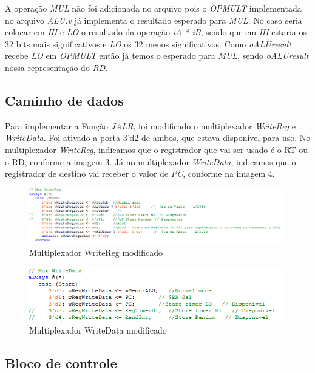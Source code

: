 \documentclass[12pt]{article}
\begin{document}
A operação \textit{MUL} não foi adicionada no arquivo pois o \textit{OPMULT} implementada no arquivo \textit{ALU.v} já implementa o resultado esperado para \textit{MUL}. No caso seria colocar em \textit{HI} e \textit{LO} o resultado da operação \textit{iA * iB}, sendo que em \textit{HI} estaria os 32 bits mais significativos e \textit{LO} os 32 menos significativos. Como \textit{oALUresult} recebe \textit{LO} em \textit{OPMULT} então já temos o esperado para \textit{MUL}, sendo \textit{oALUresult} nossa representação do \textit{RD}.

\subsection{Caminho de dados}
\label{subsec:datapath}

Para implementar a Função \textit{JALR}, foi modificado o multiplexador \textit{WriteReg} e \textit{WriteData}. Foi ativado a porta 3'd2 de ambos, que estava disponível para uso. No multiplexador \textit{WriteReg}, indicamos que o registrador que vai ser usado é o RT ou o RD, conforme a imagem 3. Já no multiplexador \textit{WriteData}, indicamos que o registrador de destino vai receber o valor de \textit{PC}, conforme na imagem 4.    

\begin{figure}[H]
	\flushleft
	\includegraphics[width=1\textwidth]{MUXWR.png}
	\caption{Multiplexador WriteReg modificado}
	\label{fig:pest}
\end{figure}

\begin{figure}[H]
	\flushleft
	\includegraphics[width=1\textwidth]{MUXWD.png}
	\caption{Multiplexador WriteData modificado}
	\label{fig:pest}
\end{figure}

\subsection{Bloco de controle}
\label{subsec:control}
\end{document}
